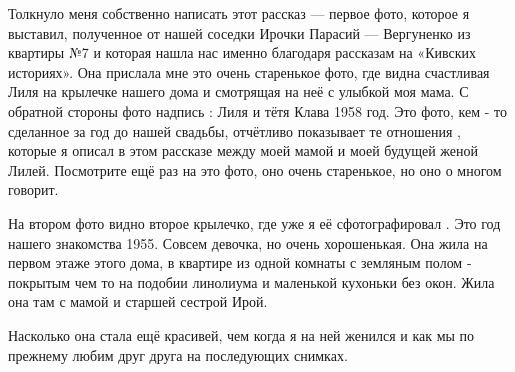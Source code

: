 Толкнуло  меня собственно  написать этот рассказ — первое  фото, которое я
выставил, полученное  от нашей соседки Ирочки Парасий — Вергуненко  из
квартиры №7 и которая нашла нас именно благодаря рассказам на  «Кивских
историях». Она прислала мне это  очень старенькое фото, где  видна счастливая
Лиля на крылечке нашего дома и смотрящая на неё  с улыбкой моя мама. С обратной
стороны фото надпись : Лиля  и тётя Клава 1958 год.  Это фото, кем - то
сделанное за год до нашей свадьбы,  отчётливо показывает те отношения , которые
я описал в этом рассказе между моей мамой и моей будущей женой Лилей.
Посмотрите ещё раз на это фото, оно очень старенькое, но оно  о многом говорит. 

На втором фото видно второе крылечко, где  уже я её сфотографировал . Это год
нашего знакомства 1955. Совсем девочка, но очень  хорошенькая. Она жила на
первом этаже этого дома, в квартире  из одной комнаты с земляным полом  -
покрытым чем то на подобии линолиума и маленькой кухоньки  без окон.   Жила она
там с мамой и старшей сестрой Ирой.

Насколько  она стала ещё красивей, чем когда я на ней женился  и как мы   по
прежнему любим друг друга  на последующих снимках.
